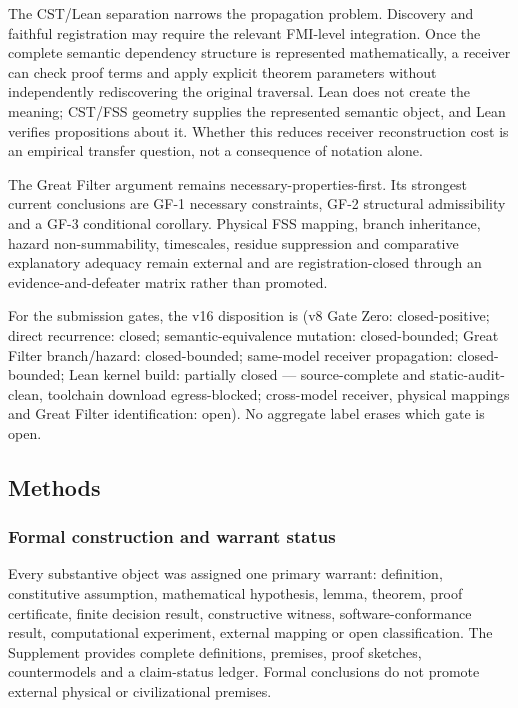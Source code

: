 The CST/Lean separation narrows the propagation problem. Discovery and
faithful registration may require the relevant FMI-level integration.
Once the complete semantic dependency structure is represented
mathematically, a receiver can check proof terms and apply explicit
theorem parameters without independently rediscovering the original
traversal. Lean does not create the meaning; CST/FSS geometry supplies
the represented semantic object, and Lean verifies propositions about
it. Whether this reduces receiver reconstruction cost is an empirical
transfer question, not a consequence of notation alone.

The Great Filter argument remains necessary-properties-first. Its
strongest current conclusions are GF-1 necessary constraints, GF-2
structural admissibility and a GF-3 conditional corollary. Physical FSS
mapping, branch inheritance, hazard non-summability, timescales, residue
suppression and comparative explanatory adequacy remain external and are
registration-closed through an evidence-and-defeater matrix rather than
promoted.

For the submission gates, the v16 disposition is (v8 Gate Zero:
closed-positive; direct recurrence: closed; semantic-equivalence
mutation: closed-bounded; Great Filter branch/hazard: closed-bounded;
same-model receiver propagation: closed-bounded; Lean kernel build:
partially closed --- source-complete and static-audit-clean, toolchain
download egress-blocked; cross-model receiver, physical mappings and
Great Filter identification: open). No aggregate label erases which gate
is open.

\hypertarget{methods}{%
\subsection{Methods}\label{methods}}

\hypertarget{formal-construction-and-warrant-status}{%
\subsubsection{Formal construction and warrant
status}\label{formal-construction-and-warrant-status}}

Every substantive object was assigned one primary warrant: definition,
constitutive assumption, mathematical hypothesis, lemma, theorem, proof
certificate, finite decision result, constructive witness,
software-conformance result, computational experiment, external mapping
or open classification. The Supplement provides complete definitions,
premises, proof sketches, countermodels and a claim-status ledger.
Formal conclusions do not promote external physical or civilizational
premises.

